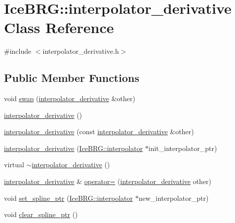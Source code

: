 \hypertarget{classIceBRG_1_1interpolator__derivative}{}\section{Ice\+B\+R\+G\+:\+:interpolator\+\_\+derivative Class Reference}
\label{classIceBRG_1_1interpolator__derivative}


{\ttfamily \#include $<$interpolator\+\_\+derivative.\+h$>$}

\subsection*{Public Member Functions}
\begin{DoxyCompactItemize}
\item 
void \hyperlink{classIceBRG_1_1interpolator__derivative_a59480c69b2e3512ac20c5fdf63bc9bf5}{swap} (\hyperlink{classIceBRG_1_1interpolator__derivative}{interpolator\+\_\+derivative} \&other)
\item 
\hyperlink{classIceBRG_1_1interpolator__derivative_abd5850c4412171559d4aa969496518f0}{interpolator\+\_\+derivative} ()
\item 
\hyperlink{classIceBRG_1_1interpolator__derivative_a447e5dd6baffb334c2d26095e0a32eb3}{interpolator\+\_\+derivative} (const \hyperlink{classIceBRG_1_1interpolator__derivative}{interpolator\+\_\+derivative} \&other)
\item 
\hyperlink{classIceBRG_1_1interpolator__derivative_ab0e98f98e310e1c2b3a3f0b6aa25298c}{interpolator\+\_\+derivative} (\hyperlink{classIceBRG_1_1interpolator}{Ice\+B\+R\+G\+::interpolator} $\ast$init\+\_\+interpolator\+\_\+ptr)
\item 
virtual \hyperlink{classIceBRG_1_1interpolator__derivative_abfc27866b76d259b09f996d03e7442bf}{$\sim$interpolator\+\_\+derivative} ()
\item 
\hyperlink{classIceBRG_1_1interpolator__derivative}{interpolator\+\_\+derivative} \& \hyperlink{classIceBRG_1_1interpolator__derivative_ae99c1f30d0dbd9fe385d9b96a2ba5cc6}{operator=} (\hyperlink{classIceBRG_1_1interpolator__derivative}{interpolator\+\_\+derivative} other)
\item 
void \hyperlink{classIceBRG_1_1interpolator__derivative_a02bd90421e715a5044fe1b98e6cc9d8d}{set\+\_\+spline\+\_\+ptr} (\hyperlink{classIceBRG_1_1interpolator}{Ice\+B\+R\+G\+::interpolator} $\ast$new\+\_\+interpolator\+\_\+ptr)
\item 
void \hyperlink{classIceBRG_1_1interpolator__derivative_aca8bc27001b7a41ee20346cc8a315e3a}{clear\+\_\+spline\+\_\+ptr} ()

\end{DoxyCompactItemize}
